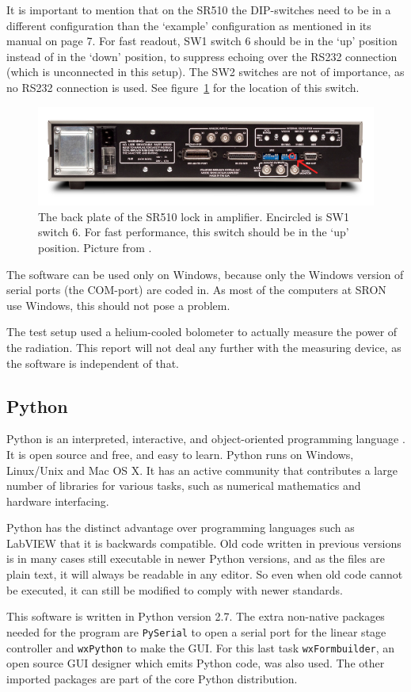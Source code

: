 It is important to mention that on the SR510 the DIP-switches need to be in a different configuration than the `example' configuration as mentioned in its manual on page 7. For fast readout, SW1 switch 6 should be in the `up' position instead of in the `down' position, to suppress echoing over the RS232 connection (which is unconnected in this setup). The SW2 switches are not of importance, as no RS232 connection is used. See figure~\ref{fig:SR510_back} for the location of this switch.

\begin{figure}[h!tb]
 \begin{center}
  \includegraphics[width=\textwidth]{figures/SR510_Rear_circle.jpg}
  \caption{The back plate of the SR510 lock in amplifier. Encircled is SW1 switch 6. For fast performance, this switch should be in the `up' position. Picture from \cite{SR}.}
  \label{fig:SR510_back}
 \end{center}
\end{figure}

The software can be used only on Windows, because only the Windows version of serial ports (the COM-port) are coded in. As most of the computers at SRON use Windows, this should not pose a problem.

The test setup used a helium-cooled bolometer to actually measure the power of the radiation. This report will not deal any further with the measuring device, as the software is independent of that.

\subsection{Python}
Python is an interpreted, interactive, and object-oriented programming language \cite{python}. It is open source and free, and easy to learn. Python runs on Windows, Linux/Unix and Mac OS X. It has an active community that contributes a large number of libraries for various tasks, such as numerical mathematics and hardware interfacing.

Python has the distinct advantage over programming languages such as LabVIEW that it is backwards compatible. Old code written in previous versions is in many cases still executable in newer Python versions, and as the files are plain text, it will always be readable in any editor. So even when old code cannot be executed, it can still be modified to comply with newer standards.

This software is written in Python version 2.7. The extra non-native packages needed for the program are \verb!PySerial! to open a serial port for the linear stage controller and \verb!wxPython! to make the GUI. For this last task \verb!wxFormbuilder!, an open source GUI designer which emits Python code, was also used. The other imported packages are part of the core Python distribution.
